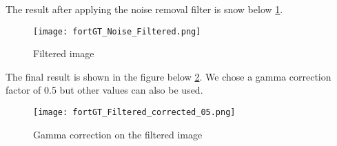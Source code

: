 The result after applying the noise removal filter is snow below \ref{fig:fortGT_Noise_Filtered}.
\begin{figure}[h!]
    \centering
    \texttt{[image: fortGT\_Noise\_Filtered.png]}
    \caption{Filtered image}
    \label{fig:fortGT_Noise_Filtered}
\end{figure}

The final result is shown in the figure below \ref{fig:fortGT_Filtered_corrected_05}. We chose a gamma correction factor of 0.5 but other values can also be used.
\begin{figure}[h!]
    \centering
    \texttt{[image: fortGT\_Filtered\_corrected\_05.png]}
    \caption{Gamma correction on the filtered image}
    \label{fig:fortGT_Filtered_corrected_05}
\end{figure}
